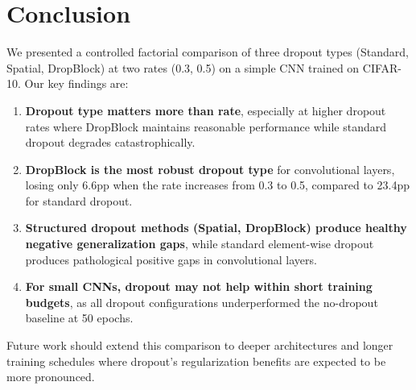 \documentclass[11pt]{article}
\begin{document}
\section{Conclusion}

We presented a controlled factorial comparison of three dropout types (Standard, Spatial, DropBlock) at two rates (0.3, 0.5) on a simple CNN trained on CIFAR-10. Our key findings are:

\begin{enumerate}
    \item \textbf{Dropout type matters more than rate}, especially at higher dropout rates where DropBlock maintains reasonable performance while standard dropout degrades catastrophically.
    \item \textbf{DropBlock is the most robust dropout type} for convolutional layers, losing only 6.6pp when the rate increases from 0.3 to 0.5, compared to 23.4pp for standard dropout.
    \item \textbf{Structured dropout methods (Spatial, DropBlock) produce healthy negative generalization gaps}, while standard element-wise dropout produces pathological positive gaps in convolutional layers.
    \item \textbf{For small CNNs, dropout may not help within short training budgets}, as all dropout configurations underperformed the no-dropout baseline at 50 epochs.
\end{enumerate}

Future work should extend this comparison to deeper architectures and longer training schedules where dropout's regularization benefits are expected to be more pronounced.


\end{document}
